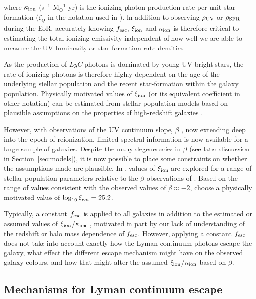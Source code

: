\noindent where $\kappa_{\rm{ion}}$ (s$^{-1}$ M$_{\odot}^{-1}$ yr) is the ionizing photon production-rate per unit star-formation ($\zeta_{Q}$ in the notation used in \citet{2010Natur.468...49R}). In addition to observing $\rho_{\rm{UV}}$ or $\rho_{\rm{SFR}}$ during the EoR, accurately knowing $f_{\rm{esc}}$, $\xi_{\rm{ion}}$ and $\kappa_{\rm{ion}}$ is therefore critical to estimating the total ionizing emissivity independent of how well we are able to measure the UV luminosity or star-formation rate densities.

As the production of $LyC$ photons is dominated by young UV-bright stars, the rate of ionizing photons is therefore highly dependent on the age of the underlying stellar population and the recent star-formation within the galaxy population. Physically motivated values of $\xi_{\rm{ion}}$ (or its equivalent coefficient in other notation) can be estimated from stellar population models based on plausible assumptions on the properties of high-redshift galaxies \citep{Bolton:2007gc,Ouchi:2009jd,Kuhlen:2012ka}. 

However, with observations of the UV continuum slope, $\beta$ \citep{1994ApJ...429..582C}, now extending deep into the epoch of reionization, limited spectral information is now available for a large sample of galaxies. Despite the many degeneracies in $\beta$ (see later discussion in Section~\ref{sec:models}), it is now possible to place some constraints on whether the assumptions made are plausible. In \citet{Robertson:2013ji}, values of $\xi_{\rm{ion}}$ are explored for a range of stellar population parameters relative to the $\beta$ observations of \citet{Dunlop:2013kp}. Based on the range of values consistent with the observed values of $\beta \approx -2$, \citeauthor{Robertson:2013ji} choose a physically motivated value of $\log_{10}\xi_{\rm{ion}} = 25.2$. 

Typically, a constant $f_{\rm{esc}}$ is applied to all galaxies in addition to the estimated or assumed values of $\xi_{\rm{ion}}$/$\kappa_{\rm{ion}}$ \citep{Ouchi:2009jd,Finkelstein:2012hr,Robertson:2013ji}, motivated in part by our lack of understanding of the redshift or halo mass dependence of $f_{\rm{esc}}$. However, applying a constant $f_{\rm{esc}}$ does not take into account exactly how the Lyman continuum photons escape the galaxy, what effect the different escape mechanism might have on the observed galaxy colours, and how that might alter the assumed $\xi_{\rm{ion}}$/$\kappa_{\rm{ion}}$ based on $\beta$. 

\subsection{Mechanisms for Lyman continuum escape}\label{sec:escape_mechanisms}

